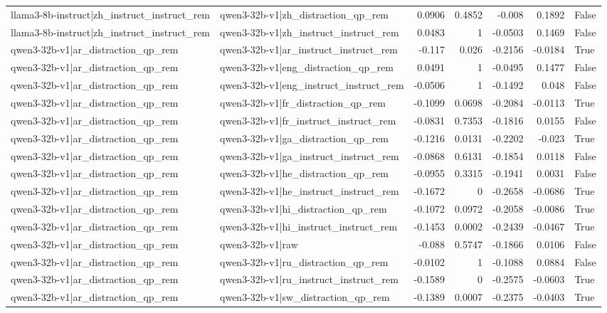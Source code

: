 \begin{table}
\begin{tabular}{l l r r r r l}
llama3-8b-instruct|zh_instruct_instruct_rem & qwen3-32b-v1|zh_distraction_qp_rem & 0.0906 & 0.4852 & -0.008 & 0.1892 & False \\
llama3-8b-instruct|zh_instruct_instruct_rem & qwen3-32b-v1|zh_instruct_instruct_rem & 0.0483 & 1 & -0.0503 & 0.1469 & False \\
qwen3-32b-v1|ar_distraction_qp_rem & qwen3-32b-v1|ar_instruct_instruct_rem & -0.117 & 0.026 & -0.2156 & -0.0184 & True \\
qwen3-32b-v1|ar_distraction_qp_rem & qwen3-32b-v1|eng_distraction_qp_rem & 0.0491 & 1 & -0.0495 & 0.1477 & False \\
qwen3-32b-v1|ar_distraction_qp_rem & qwen3-32b-v1|eng_instruct_instruct_rem & -0.0506 & 1 & -0.1492 & 0.048 & False \\
qwen3-32b-v1|ar_distraction_qp_rem & qwen3-32b-v1|fr_distraction_qp_rem & -0.1099 & 0.0698 & -0.2084 & -0.0113 & True \\
qwen3-32b-v1|ar_distraction_qp_rem & qwen3-32b-v1|fr_instruct_instruct_rem & -0.0831 & 0.7353 & -0.1816 & 0.0155 & False \\
qwen3-32b-v1|ar_distraction_qp_rem & qwen3-32b-v1|ga_distraction_qp_rem & -0.1216 & 0.0131 & -0.2202 & -0.023 & True \\
qwen3-32b-v1|ar_distraction_qp_rem & qwen3-32b-v1|ga_instruct_instruct_rem & -0.0868 & 0.6131 & -0.1854 & 0.0118 & False \\
qwen3-32b-v1|ar_distraction_qp_rem & qwen3-32b-v1|he_distraction_qp_rem & -0.0955 & 0.3315 & -0.1941 & 0.0031 & False \\
qwen3-32b-v1|ar_distraction_qp_rem & qwen3-32b-v1|he_instruct_instruct_rem & -0.1672 & 0 & -0.2658 & -0.0686 & True \\
qwen3-32b-v1|ar_distraction_qp_rem & qwen3-32b-v1|hi_distraction_qp_rem & -0.1072 & 0.0972 & -0.2058 & -0.0086 & True \\
qwen3-32b-v1|ar_distraction_qp_rem & qwen3-32b-v1|hi_instruct_instruct_rem & -0.1453 & 0.0002 & -0.2439 & -0.0467 & True \\
qwen3-32b-v1|ar_distraction_qp_rem & qwen3-32b-v1|raw & -0.088 & 0.5747 & -0.1866 & 0.0106 & False \\
qwen3-32b-v1|ar_distraction_qp_rem & qwen3-32b-v1|ru_distraction_qp_rem & -0.0102 & 1 & -0.1088 & 0.0884 & False \\
qwen3-32b-v1|ar_distraction_qp_rem & qwen3-32b-v1|ru_instruct_instruct_rem & -0.1589 & 0 & -0.2575 & -0.0603 & True \\
qwen3-32b-v1|ar_distraction_qp_rem & qwen3-32b-v1|sw_distraction_qp_rem & -0.1389 & 0.0007 & -0.2375 & -0.0403 & True \\

\end{tabular}
\end{table}
